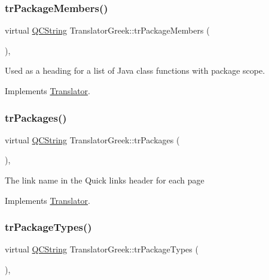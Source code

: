 \subsubsection{\texorpdfstring{trPackageMembers()}{trPackageMembers()}}
{\footnotesize\ttfamily virtual \mbox{\hyperlink{class_q_c_string}{Q\+C\+String}} Translator\+Greek\+::tr\+Package\+Members (\begin{DoxyParamCaption}{ }\end{DoxyParamCaption})\hspace{0.3cm}{\ttfamily [inline]}, {\ttfamily [virtual]}}

Used as a heading for a list of Java class functions with package scope. 

Implements \mbox{\hyperlink{class_translator}{Translator}}.

\mbox{\label{class_translator_greek_aaa60df56a2b291bbff3ec287cf04f953}} 
\subsubsection{\texorpdfstring{trPackages()}{trPackages()}}
{\footnotesize\ttfamily virtual \mbox{\hyperlink{class_q_c_string}{Q\+C\+String}} Translator\+Greek\+::tr\+Packages (\begin{DoxyParamCaption}{ }\end{DoxyParamCaption})\hspace{0.3cm}{\ttfamily [inline]}, {\ttfamily [virtual]}}

The link name in the Quick links header for each page 

Implements \mbox{\hyperlink{class_translator}{Translator}}.

\mbox{\label{class_translator_greek_a380a110ec43538fef2ce37e1f1278df8}} 
\subsubsection{\texorpdfstring{trPackageTypes()}{trPackageTypes()}}
{\footnotesize\ttfamily virtual \mbox{\hyperlink{class_q_c_string}{Q\+C\+String}} Translator\+Greek\+::tr\+Package\+Types (\begin{DoxyParamCaption}{ }\end{DoxyParamCaption})\hspace{0.3cm}{\ttfamily [inline]}, {\ttfamily [virtual]}}

